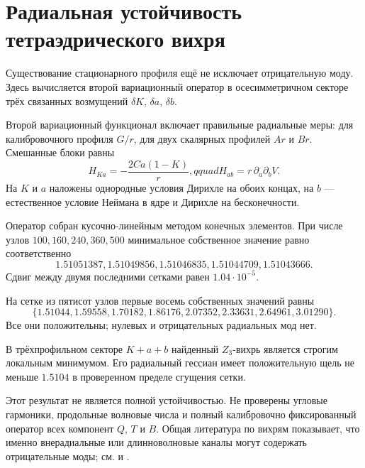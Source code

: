 \chapter{Радиальная устойчивость тетраэдрического вихря}

Существование стационарного профиля ещё не исключает отрицательную моду.
Здесь вычисляется второй вариационный оператор в осесимметричном секторе
трёх связанных возмущений $\delta K$, $\delta a$, $\delta b$.

Второй вариационный функционал включает правильные радиальные меры:
для калибровочного профиля $G/r$, для двух скалярных профилей $Ar$ и
$Br$. Смешанные блоки равны
\begin{equation}
 H_{Ka}=-\frac{2Ca(1-K)}r,qquad
 H_{ab}=r\,\partial_a\partial_bV.
\end{equation}
На $K$ и $a$ наложены однородные условия Дирихле на обоих концах, на
$b$ --- естественное условие Неймана в ядре и Дирихле на бесконечности.

Оператор собран кусочно-линейным методом конечных элементов. При числе
узлов $100,160,240,360,500$ минимальное собственное значение равно
соответственно
\begin{equation}
 1.51051387, 1.51049856, 1.51046835, 1.51044709, 1.51043666.
\end{equation}
Сдвиг между двумя последними сетками равен $1.04\cdot10^{-5}$.

На сетке из пятисот узлов первые восемь собственных значений равны
\begin{equation}
 \{1.51044,1.59558,1.70182,1.86176,
 2.07352,2.33631,2.64961,3.01290\}.
\end{equation}
Все они положительны; нулевых и отрицательных радиальных мод нет.

\begin{theorem}
В трёхпрофильном секторе $K+a+b$ найденный $Z_3$-вихрь является строгим
локальным минимумом. Его радиальный гессиан имеет положительную щель не
меньше $1.5104$ в проверенном пределе сгущения сетки.
\end{theorem}

Этот результат не является полной устойчивостью. Не проверены угловые
гармоники, продольные волновые числа и полный калибровочно фиксированный
оператор всех компонент $Q$, $T$ и $B$. Общая литература по вихрям
показывает, что именно внерадиальные или длинноволновые каналы могут
содержать отрицательные моды; см.  и
.

